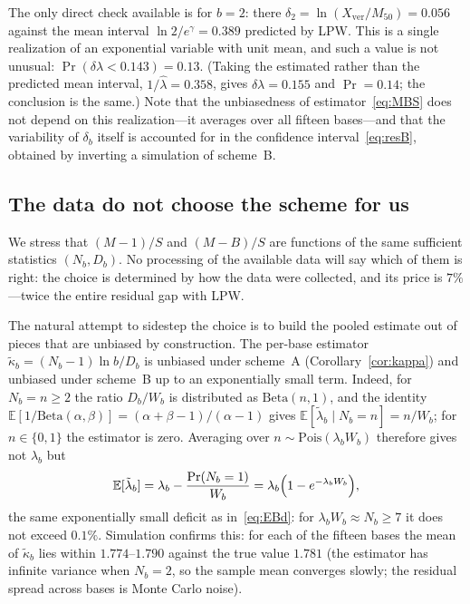 \documentclass[11pt,a4paper]{article}
\theoremstyle{plain}
\theoremstyle{remark}
\newcommand{\eg}{e^{\gamma}}
\begin{document}
The only direct check available is for $b=2$: there
$\delta_2=\ln(X_{\mathrm{ver}}/M_{50})=0.056$ against the mean interval
$\ln 2/\eg=0.389$ predicted by LPW. This is a single realization of an
exponential variable with unit mean, and such a value is not unusual:
$\Pr(\delta\lambda<0.143)=0.13$. (Taking the estimated rather than the predicted
mean interval, $1/\hat\lambda=0.358$, gives $\delta\lambda=0.155$ and
$\Pr=0.14$; the conclusion is the same.) Note that the unbiasedness of
estimator~\eqref{eq:MBS} does not depend on this realization---it averages over
all fifteen bases---and that the variability of $\delta_b$ itself is accounted
for in the confidence interval~\eqref{eq:resB}, obtained by inverting a
simulation of scheme~B.

\subsection{The data do not choose the scheme for us}\label{sec:noescape}

We stress that $(M-1)/S$ and $(M-B)/S$ are functions of the same sufficient
statistics $(N_b,D_b)$. No processing of the available data will say which of
them is right: the choice is determined by how the data were collected, and its
price is $7\%$---twice the entire residual gap with LPW.

The natural attempt to sidestep the choice is to build the pooled estimate out
of pieces that are unbiased by construction. The per-base estimator
$\tilde\kappa_b=(N_b-1)\ln b/D_b$ is unbiased under scheme~A
(Corollary~\ref{cor:kappa}) and unbiased under scheme~B up to an exponentially
small term. Indeed, for $N_b=n\ge2$ the ratio $D_b/W_b$ is distributed as
$\mathrm{Beta}(n,1)$, and the identity
$\mathbb E[1/\mathrm{Beta}(\alpha,\beta)]=(\alpha+\beta-1)/(\alpha-1)$ gives
$\mathbb E[\tilde\lambda_b\mid N_b=n]=n/W_b$; for $n\in\{0,1\}$ the estimator is
zero. Averaging over $n\sim\mathrm{Pois}(\lambda_bW_b)$ therefore gives not
$\lambda_b$ but
\[
  \mathbb E[\tilde\lambda_b]=\lambda_b-\frac{\Pr(N_b=1)}{W_b}
  =\lambda_b\Bigl(1-e^{-\lambda_bW_b}\Bigr),
\]
the same exponentially small deficit as in~\eqref{eq:EBd}: for
$\lambda_bW_b\approx N_b\ge7$ it does not exceed $0.1\%$. Simulation confirms
this: for each of the fifteen bases the mean of $\tilde\kappa_b$ lies within
$1.774$--$1.790$ against the true value $1.781$ (the estimator has infinite
variance when $N_b=2$, so the sample mean converges slowly; the residual spread
across bases is Monte Carlo noise).
\end{document}
